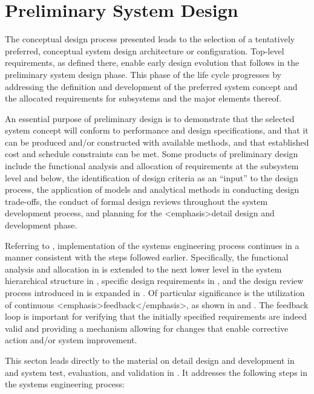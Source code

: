 \section{Preliminary System Design}

The conceptual design process presented leads to the selection of a tentatively preferred, conceptual system design architecture or configuration. Top-level requirements, as defined there, enable early design evolution that follows in the preliminary system design phase. This phase of the life cycle progresses by addressing the definition and development of the preferred system concept and the allocated requirements for subsystems and the major elements thereof.

An essential purpose of preliminary design is to demonstrate that the selected system concept will conform to performance and design specifications, and that it can be produced and/or constructed with available methods, and that established cost and schedule constraints can be met. Some products of preliminary design include the functional analysis and allocation of requirements at the subsystem level and below, the identification of design criteria as an ``input'' to the design process, the application of models and analytical methods in conducting design trade-offs, the conduct of formal design reviews throughout the system development process, and planning for the <emphasis>detail design and development phase.

Referring to , implementation of the systems engineering process continues in a manner consistent with the steps followed earlier. Specifically, the functional analysis and allocation in  is extended to the next lower level in the system hierarchical structure in , specific design requirements in , and the design review process introduced in  is expanded in . Of particular significance is the utilization of continuous <emphasis>feedback</emphasis>, as shown in  and . The feedback loop is important for verifying that the initially specified requirements are indeed valid and providing a mechanism allowing for changes that enable corrective action and/or system improvement.

This secton leads directly to the material on detail design and development in and system test, evaluation, and validation in . It addresses the following steps in the systems engineering process:

